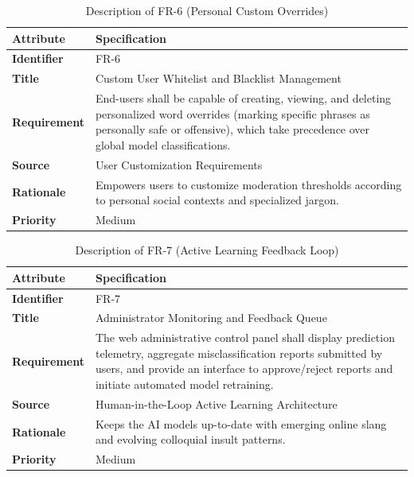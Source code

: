 \documentclass[A4paper,12pt]{report}
\theoremstyle{plain}
\theoremstyle{definition}
\theoremstyle{remark}
\numberwithin{equation}{section}
\begin{document}
\begin{table}[H]
\centering
\caption{Description of FR-6 (Personal Custom Overrides)}
\renewcommand{\arraystretch}{1.3}
\begin{tabular}{|p{3.5cm}|p{10.5cm}|}
\hline
\textbf{Attribute} & \textbf{Specification} \\ \hline
\textbf{Identifier} & FR-6 \\ \hline
\textbf{Title} & Custom User Whitelist and Blacklist Management \\ \hline
\textbf{Requirement} & End-users shall be capable of creating, viewing, and deleting personalized word overrides (marking specific phrases as personally safe or offensive), which take precedence over global model classifications. \\ \hline
\textbf{Source} & User Customization Requirements \\ \hline
\textbf{Rationale} & Empowers users to customize moderation thresholds according to personal social contexts and specialized jargon. \\ \hline
\textbf{Priority} & Medium \\ \hline
\end{tabular}
\end{table}

\begin{table}[H]
\centering
\caption{Description of FR-7 (Active Learning Feedback Loop)}
\renewcommand{\arraystretch}{1.3}
\begin{tabular}{|p{3.5cm}|p{10.5cm}|}
\hline
\textbf{Attribute} & \textbf{Specification} \\ \hline
\textbf{Identifier} & FR-7 \\ \hline
\textbf{Title} & Administrator Monitoring and Feedback Queue \\ \hline
\textbf{Requirement} & The web administrative control panel shall display prediction telemetry, aggregate misclassification reports submitted by users, and provide an interface to approve/reject reports and initiate automated model retraining. \\ \hline
\textbf{Source} & Human-in-the-Loop Active Learning Architecture \\ \hline
\textbf{Rationale} & Keeps the AI models up-to-date with emerging online slang and evolving colloquial insult patterns. \\ \hline
\textbf{Priority} & Medium \\ \hline
\end{tabular}
\end{table}
\end{document}
